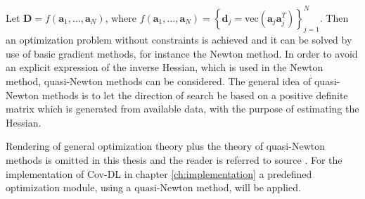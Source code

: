 Let $\textbf{D} = f(\textbf{a}_1, \hdots, \textbf{a}_N)$, where $f(\textbf{a}_1, \hdots, \textbf{a}_N) = \left\{\textbf{d}_j = \text{vec}(\textbf{a}_j\textbf{a}_j^T) \right\}_{j=1}^{N} $. Then an optimization problem without constraints is achieved and it can be solved by use of basic gradient methods, for instance the Newton method. In order to avoid an explicit expression of the inverse Hessian, which is used in the Newton method, quasi-Newton methods can be considered\cite{Optimization2007}.  
The general idea of quasi-Newton methods is to let the direction of search be based on a positive definite matrix which is generated from available data, with the purpose of estimating the Hessian. 

Rendering of general optimization theory plus the theory of quasi-Newton methods is omitted in this thesis and the reader is referred to source \cite{Optimization2007}.
For the implementation of Cov-DL in chapter \ref{ch:implementation} a predefined optimization module, using a quasi-Newton method, will be applied.   
   

